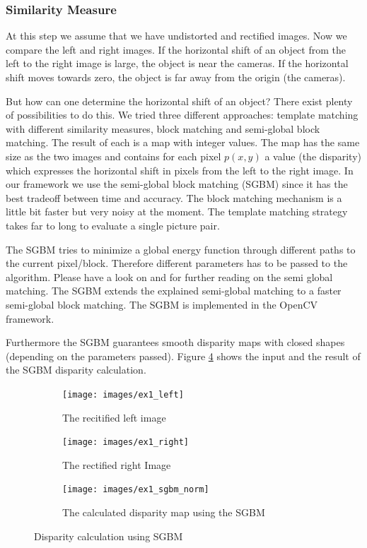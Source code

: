 \documentclass[11pt]{article}
\begin{document}
\subsubsection{Similarity Measure}
At this step we assume that we have undistorted and rectified images. Now we compare the left and right images. If the horizontal shift of an object from the left to the right image is large, the object is near the cameras. If the horizontal shift moves towards zero, the object is far away from the origin (the cameras).

But how can one determine the horizontal shift of an object? There exist plenty of possibilities to do this. We tried three different approaches: template matching with different similarity measures, block matching and semi-global block matching. The result of each is a map with integer values. The map has the same size as the two images and contains for each pixel $p(x,y)$ a value (the disparity) which expresses the horizontal shift in pixels from the left to the right image. In our framework we use the semi-global block matching (SGBM) since it has the best tradeoff between time and accuracy. The block matching mechanism is a little bit faster but very noisy at the moment. The template matching strategy takes far to long to evaluate a single picture pair. 

The SGBM tries to minimize a global energy function through different paths to the current pixel/block. Therefore different parameters has to be passed to the algorithm. Please have a look on \cite{hirschmuller2005accurate} and \cite{hirschmuller2008stereo} for further reading on the semi global matching. The SGBM extends the explained semi-global matching to a faster semi-global block matching. The SGBM is implemented in the OpenCV framework.

Furthermore the SGBM guarantees smooth disparity maps with closed shapes (depending on the parameters passed). Figure \ref{fig:ex1_sgbm} shows the input and the result of the SGBM disparity calculation.

\begin{figure}[H]
        \centering
        \begin{subfigure}[b]{0.45\textwidth}
                \texttt{[image: images/ex1\_left]}
                \caption{The recitified left image}
                \label{fig:ex1_left}
        \end{subfigure}\hfill  
        \begin{subfigure}[b]{0.45\textwidth}
                \texttt{[image: images/ex1\_right]}
                \caption{The rectified right Image}
                \label{fig:ex1_right}
        \end{subfigure}

        \begin{subfigure}[b]{\textwidth}
                \texttt{[image: images/ex1\_sgbm\_norm]}
                \caption{The calculated disparity map using the SGBM}
                \label{fig:ex1_sgbm_norm}
        \end{subfigure}
        \caption{Disparity calculation using SGBM}\label{fig:ex1_sgbm}
\end{figure}
\end{document}
